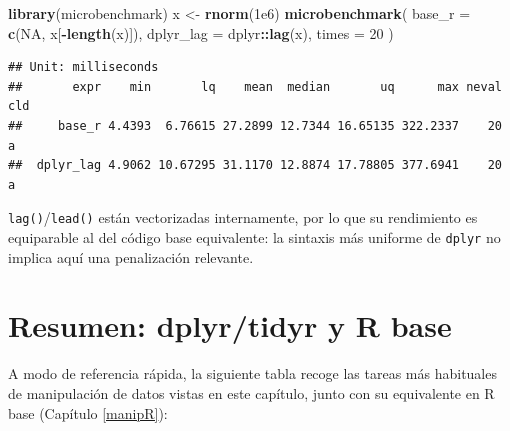 \documentclass[
]{book}
\newenvironment{Shaded}{\begin{snugshade}}{\end{snugshade}}
\newcommand{\AttributeTok}[1]{\textcolor[rgb]{0.13,0.29,0.53}{#1}}
\newcommand{\ConstantTok}[1]{\textcolor[rgb]{0.56,0.35,0.01}{#1}}
\newcommand{\DecValTok}[1]{\textcolor[rgb]{0.00,0.00,0.81}{#1}}
\newcommand{\FloatTok}[1]{\textcolor[rgb]{0.00,0.00,0.81}{#1}}
\newcommand{\FunctionTok}[1]{\textcolor[rgb]{0.13,0.29,0.53}{\textbf{#1}}}
\newcommand{\NormalTok}[1]{#1}
\newcommand{\OtherTok}[1]{\textcolor[rgb]{0.56,0.35,0.01}{#1}}
\newcommand{\SpecialCharTok}[1]{\textcolor[rgb]{0.81,0.36,0.00}{\textbf{#1}}}
\theoremstyle{break}
\theoremstyle{nonumberplain}
\begin{document}
\begin{Shaded}
\begin{Highlighting}[]
\FunctionTok{library}\NormalTok{(microbenchmark)}
\NormalTok{x }\OtherTok{\textless{}{-}} \FunctionTok{rnorm}\NormalTok{(}\FloatTok{1e6}\NormalTok{)}
\FunctionTok{microbenchmark}\NormalTok{(}
  \AttributeTok{base\_r    =} \FunctionTok{c}\NormalTok{(}\ConstantTok{NA}\NormalTok{, x[}\SpecialCharTok{{-}}\FunctionTok{length}\NormalTok{(x)]),}
  \AttributeTok{dplyr\_lag =}\NormalTok{ dplyr}\SpecialCharTok{::}\FunctionTok{lag}\NormalTok{(x),}
  \AttributeTok{times =} \DecValTok{20}
\NormalTok{)}
\end{Highlighting}
\end{Shaded}

\begin{verbatim}
## Unit: milliseconds
##       expr    min       lq    mean  median       uq      max neval cld
##     base_r 4.4393  6.76615 27.2899 12.7344 16.65135 322.2337    20   a
##  dplyr_lag 4.9062 10.67295 31.1170 12.8874 17.78805 377.6941    20   a
\end{verbatim}

\texttt{lag()}/\texttt{lead()} están vectorizadas internamente, por lo que su rendimiento es equiparable al del código base equivalente: la sintaxis más uniforme de \texttt{dplyr} no implica aquí una penalización relevante.

\section{Resumen: dplyr/tidyr y R base}\label{resumen-tidyverse}

A modo de referencia rápida, la siguiente tabla recoge las tareas más
habituales de manipulación de datos vistas en este capítulo, junto con su
equivalente en R base (Capítulo \ref{manipR}):
\end{document}
